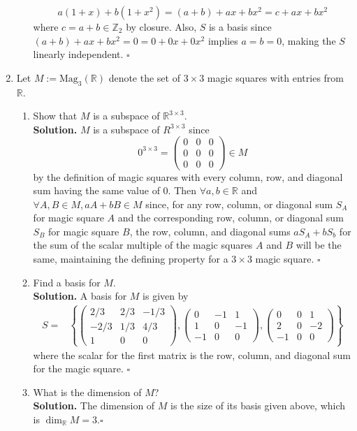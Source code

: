 \documentclass[11pt,twoside]{article}
\newcommand{\R}{\mathbb{R}}
\newcommand{\Z}{\mathbb{Z}}
\newcommand{\m}[1]{\begin{pmatrix}#1\end{pmatrix}}
\begin{document}
\begin{enumerate}
\begin{enumerate}
                    \[a(1+x)+b(1+x^2)=(a+b)+ax+bx^2=c+ax+bx^2\]
                    where $c=a+b\in \Z_2$ by closure. Also, $S$ is a basis since $(a+b)+ax+bx^2=0=0+0x+0x^2$ implies $a=b=0$, making the $S$ linearly independent. $\square$
          \end{enumerate}
    \item Let $M:=\text{Mag}_3(\R)$ denote the set of $3\times 3$ magic squares with entries from $\R$.
    \begin{enumerate}
        \item Show that $M$ is a subspace of $\R^{3\times 3}$. \\
        \textbf{Solution.} $M$ is a subspace of $R^{3\times 3}$ since
        \[0^{3\times 3}=\m{0&0&0\\0&0&0\\0&0&0}\in M\]
        by the definition of magic squares with every column, row, and diagonal sum having the same value of 0. Then $\forall a,b\in\R$ and $\forall A,B\in M, aA+bB\in M$ since, for any row, column, or diagonal sum $S_A$ for magic square $A$ and the corresponding row, column, or diagonal sum $S_B$ for magic square $B$, the row, column, and diagonal sums $aS_A + bS_b$ for the sum of the scalar multiple of the magic squares $A$ and $B$ will be the same, maintaining the defining property for a $3\times 3$ magic square. $\square$
        \item Find a basis for $M$. \\
        \textbf{Solution.} A basis for $M$ is given by 
        \begin{align*}
            S=&\left\{\m{2/3&2/3&-1/3\\-2/3&1/3&4/3\\1&0&0},\m{0&-1&1\\1&0&-1\\-1&0&0},\m{0&0&1\\2&0&-2\\-1&0&0}\right\}
        \end{align*}
        where the scalar for the first matrix is the row, column, and diagonal sum for the magic square. $\square$
        \item What is the dimension of $M$? \\
        \textbf{Solution.} The dimension of $M$ is the size of its basis given above, which is $\dim_\R{M}=3$.$\square$
    \end{enumerate}

\end{enumerate}
\end{document}
